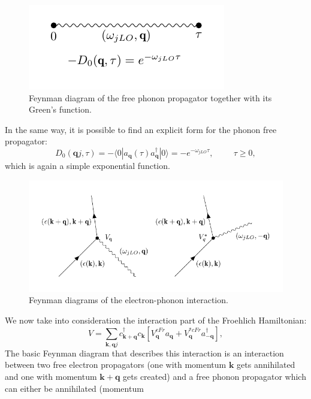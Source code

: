 \begin{figure}[H]
    \centering
    \includegraphics[scale=1]{free_ph_propagator.pdf}
    \caption{Feynman diagram of the free phonon propagator together with its Green's function.}
    \label{fig:ph_prop_free}
\end{figure}
In the same way, it is possible to find an explicit form for the phonon free propagator:
\begin{equation}
    D_0(\mathbf{q}j,\tau)=-\langle 0|a_\mathbf{q}(\tau)a^\dagger_\mathbf{q}|0\rangle=-e^{-\omega_{jLO}\tau},\hspace{1cm}\tau\ge0,
\end{equation}
which is again a simple exponential function.
\begin{figure}[H]
    \centering
    \includegraphics[scale=1.0]{interaction_vertex.pdf}
    \caption{Feynman diagrams of the electron-phonon interaction.}
    \label{fig:interaction_vertex}
\end{figure}
We now take into consideration the interaction part of the Froehlich Hamiltonian:
\begin{equation}
    V=\sum_{\mathbf{k},\mathbf{q}j}c^\dagger_{\mathbf{k+q}}c_{\mathbf{k}}\left[V^{cFr}_\mathbf{q}a_\mathbf{q}+V^{*cFr}_\mathbf{q}a^\dagger_\mathbf{-q}\right],
    \label{polaron_interacting}
\end{equation}
The basic Feynman diagram that describes this interaction is an interaction between two free electron propagators (one with momentum 
$\mathbf{k}$ gets annihilated and one with momentum $\mathbf{k+q}$ gets created) and a free phonon propagator which can either be annihilated (momentum 
